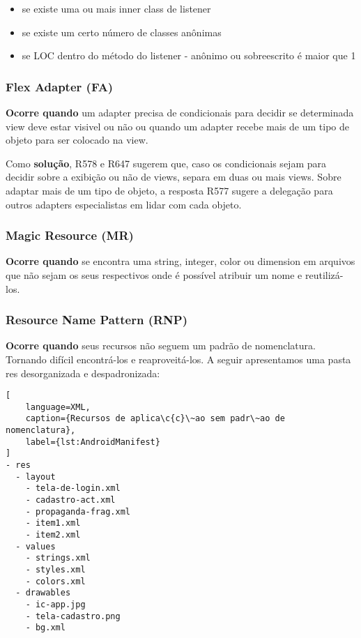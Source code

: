 \begin{itemize} 
	\item[$\circ$] [n\'ivel 4] se existe uma ou mais inner class de listener
	\item[$\circ$] [n\'ivel 3] se existe um certo n\'umero de classes an\^onimas
	\item[$\circ$] [n\'ivel 2 e 3] se LOC dentro do m\'etodo do listener - an\^onimo ou sobreescrito \'e maior que 1
\end{itemize}


\subsubsection{Flex Adapter (FA)}

\textbf{Ocorre quando} um adapter precisa de condicionais para decidir se determinada view deve estar visivel ou n\~ao ou quando um adapter recebe mais de um tipo de objeto para ser colocado na view.

Como \textbf{solu\c{c}\~ao}, R578 e R647 sugerem que, caso os condicionais sejam para decidir sobre a exibi\c{c}\~ao ou n\~ao de views, separa em duas ou mais views. Sobre adaptar mais de um tipo de objeto, a resposta R577 sugere a delega\c{c}\~ao para outros adapters especialistas em lidar com cada objeto.


\subsubsection{Magic Resource (MR)}

\textbf{Ocorre quando} se encontra uma string, integer, color ou dimension em arquivos que n\~ao sejam os seus respectivos onde \'e poss\'ivel atribuir um nome e reutiliz\'a-los. 


\subsubsection{Resource Name Pattern (RNP)}

\textbf{Ocorre quando} seus recursos n\~ao seguem um padr\~ao de nomenclatura. Tornando dif\'icil encontr\'a-los e reaproveit\'a-los. A seguir apresentamos uma pasta res desorganizada e despadronizada:

\begin{lstlisting}[
	language=XML, 
	caption={Recursos de aplica\c{c}\~ao sem padr\~ao de nomenclatura}, 
	label={lst:AndroidManifest}
]
- res
  - layout
    - tela-de-login.xml
    - cadastro-act.xml
    - propaganda-frag.xml
    - item1.xml
    - item2.xml
  - values
    - strings.xml 
    - styles.xml
    - colors.xml
  - drawables
    - ic-app.jpg
    - tela-cadastro.png
    - bg.xml
\end{lstlisting}


